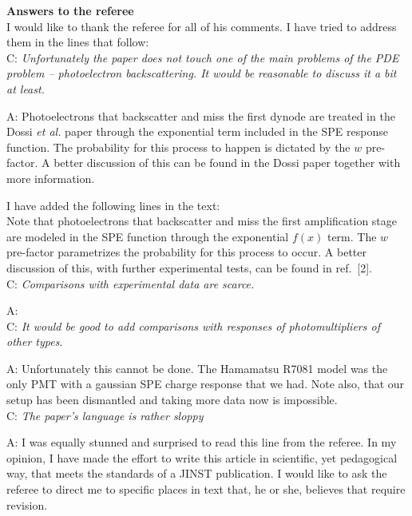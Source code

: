 \documentclass[a4paper,11pt]{article}
\begin{document}
{\bf Answers to the referee}
\\[1ex]

I would like to thank the referee for all of his comments. 
I have tried to address them in the lines that follow: 
\\[1ex]

C: \emph{Unfortunately the paper does not touch one of the main problems of the PDE problem -- photoelectron backscattering. It would be reasonable to discuss it a bit at least.}

A: Photoelectrons that backscatter and miss the first dynode are treated in the Dossi \emph{et al.} paper through the exponential term included in the SPE response function.  
The probability for this process to happen is dictated by the $w$ pre-factor. A better discussion of this can be found in the Dossi paper together with more information.

I have added the following lines in the text:
\\[1ex]

Note that photoelectrons that backscatter and miss the first amplification stage are modeled in the SPE function through the exponential $f(x)$ term. 
The $w$ pre-factor parametrizes the probability for this process to occur. A better discussion of this, with further experimental tests, can be found in ref.~[2]. 
\\[1ex]

C: \emph{Comparisons with experimental data are scarce.}

A:
\\[1ex]

C: \emph{It would be good to add comparisons with responses of photomultipliers of other types. }

A: Unfortunately this cannot be done. 
The Hamamatsu R7081 model was the only PMT with a gaussian SPE charge response that we had. 
Note also, that our setup has been dismantled and taking more data now is impossible.  
\\[1ex]

C: \emph{The paper's language is rather sloppy}

A: I was equally stunned and surprised to read this line from the referee. 
In my opinion, I have made the effort to write this article in scientific, yet pedagogical way, that meets the standards of a JINST publication. 
I would like to ask the referee to direct me to specific places in text that, he or she, believes that require revision. 
\\[1ex]
\end{document}
